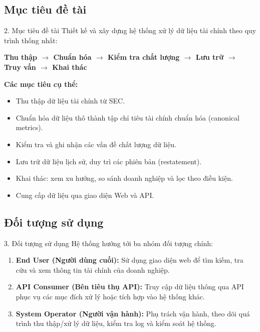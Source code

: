 \documentclass[t, aspectratio=169]{beamer} %
\begin{document}
	\subsection{Mục tiêu đề tài}
	\begin{frame}{2. Mục tiêu đề tài}
		Thiết kế và xây dựng hệ thống xử lý dữ liệu tài chính theo quy trình thống nhất:
		\begin{center}
			\textbf{Thu thập $\rightarrow$ Chuẩn hóa $\rightarrow$ Kiểm tra chất lượng $\rightarrow$ Lưu trữ $\rightarrow$ Truy vấn $\rightarrow$ Khai thác}
		\end{center}
		
		\vspace{0.5em}
		\textbf{Các mục tiêu cụ thể:}
		\begin{itemize}
			\item Thu thập dữ liệu tài chính từ SEC.
			\item Chuẩn hóa dữ liệu thô thành tập chỉ tiêu tài chính chuẩn hóa (canonical metrics).
			\item Kiểm tra và ghi nhận các vấn đề chất lượng dữ liệu.
			\item Lưu trữ dữ liệu lịch sử, duy trì các phiên bản (restatement).
			\item Khai thác: xem xu hướng, so sánh doanh nghiệp và lọc theo điều kiện.
			\item Cung cấp dữ liệu qua giao diện Web và API.
		\end{itemize}
	\end{frame}

	\subsection{Đối tượng sử dụng}
	\begin{frame}{3. Đối tượng sử dụng}
		Hệ thống hướng tới ba nhóm đối tượng chính:
		\begin{enumerate}
			\item \textbf{End User (Người dùng cuối):} Sử dụng giao diện web để tìm kiếm, tra cứu và xem thông tin tài chính của doanh nghiệp.
			\item \textbf{API Consumer (Bên tiêu thụ API):} Truy cập dữ liệu thông qua API phục vụ các mục đích xử lý hoặc tích hợp vào hệ thống khác.
			\item \textbf{System Operator (Người vận hành):} Phụ trách vận hành, theo dõi quá trình thu thập/xử lý dữ liệu, kiểm tra log và kiểm soát hệ thống.
		\end{enumerate}
	\end{frame}
	
\end{document}
